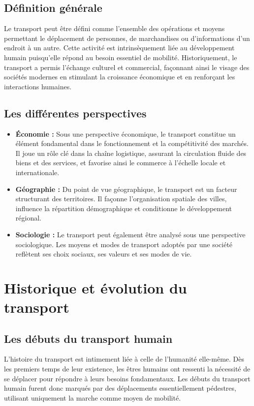 \documentclass[a4paper, 12pt]{book}
\begin{document}
\subsection{Définition générale}
Le transport peut être défini comme l'ensemble des opérations et moyens permettant le déplacement de personnes, de marchandises ou d'informations d'un endroit à un autre. Cette activité est intrinsèquement liée au développement humain puisqu'elle répond au besoin essentiel de mobilité. Historiquement, le transport a permis l'échange culturel et commercial, façonnant ainsi le visage des sociétés modernes en stimulant la croissance économique et en renforçant les interactions humaines.

\subsection{Les différentes perspectives}
\begin{itemize}
    \item \textbf{Économie :} Sous une perspective économique, le transport constitue un élément fondamental dans le fonctionnement et la compétitivité des marchés. Il joue un rôle clé dans la chaîne logistique, assurant la circulation fluide des biens et des services, et favorise ainsi le commerce à l'échelle locale et internationale.
    
    \item \textbf{Géographie :} Du point de vue géographique, le transport est un facteur structurant des territoires. Il façonne l'organisation spatiale des villes, influence la répartition démographique et conditionne le développement régional.
    
    \item \textbf{Sociologie :} Le transport peut également être analysé sous une perspective sociologique. Les moyens et modes de transport adoptés par une société reflètent ses choix sociaux, ses valeurs et ses modes de vie.
\end{itemize}

\section{Historique et évolution du transport}

\subsection{Les débuts du transport humain}
L'histoire du transport est intimement liée à celle de l'humanité elle-même. Dès les premiers temps de leur existence, les êtres humains ont ressenti la nécessité de se déplacer pour répondre à leurs besoins fondamentaux. Les débuts du transport humain furent donc marqués par des déplacements essentiellement pédestres, utilisant uniquement la marche comme moyen de mobilité.
\end{document}
